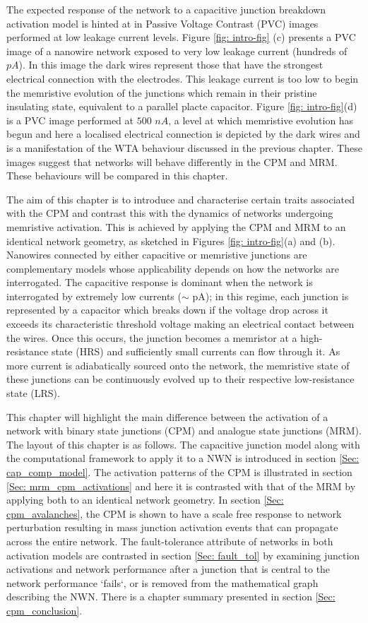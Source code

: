 The expected response of the network to a capacitive junction breakdown activation model is hinted at in Passive Voltage Contrast (PVC) images performed at low leakage current levels. Figure \ref{fig: intro-fig} (c) presents a PVC image of a nanowire network exposed to very low leakage current (hundreds of $pA$). In this image the dark wires represent those that have the strongest electrical connection with the electrodes. This leakage current is too low to begin the memristive evolution of the junctions which remain in their pristine insulating state, equivalent to a parallel placte capacitor. Figure \ref{fig: intro-fig}(d) is a PVC image performed at $500$ $nA$, a level at which memristive evolution has begun and here a localised electrical connection is depicted by the dark wires and is a manifestation of the WTA behaviour discussed in the previous chapter. These images suggest that networks will behave differently in the CPM and MRM. These behaviours will be compared in this chapter.

The aim of this chapter is to introduce and characterise certain traits associated with the CPM and contrast this with the dynamics of networks undergoing memristive activation. This is achieved by applying the CPM and MRM to an identical network geometry, as sketched in Figures \ref{fig: intro-fig}(a) and (b). Nanowires connected by either capacitive or memristive junctions are complementary models whose applicability depends on how the networks are interrogated. The capacitive response is dominant when the network is interrogated by extremely low currents ($\sim$ pA); in this regime, each junction is represented by a capacitor which breaks down if the voltage drop across it exceeds its characteristic threshold voltage making an electrical contact between the wires. Once this occurs, the junction becomes a memristor at a high-resistance state (HRS) and sufficiently small currents can flow through it. As more current is adiabatically sourced onto the network, the memristive state of these junctions can be continuously evolved up to their respective low-resistance state (LRS). 

This chapter will highlight the main difference between the activation of a network with binary state junctions (CPM) and analogue state junctions (MRM). The layout of this chapter is as follows. The capacitive junction model along with the computational framework to apply it to a NWN is introduced in section \ref{Sec: cap_comp_model}. The activation patterns of the CPM is illustrated in section \ref{Sec: mrm_cpm_activations} and here it is contrasted with that of the MRM by applying both to an identical network geometry. In section \ref{Sec: cpm_avalanches}, the CPM is shown to have a scale free response to network perturbation resulting in mass junction activation events that can propagate across the entire network. The fault-tolerance attribute of networks in both activation models are contrasted in section \ref{Sec: fault_tol} by examining junction activations and network performance after a junction that is central to the network performance `fails`, or is removed from the mathematical graph describing the NWN. There is a chapter summary presented in section \ref{Sec: cpm_conclusion}. 



